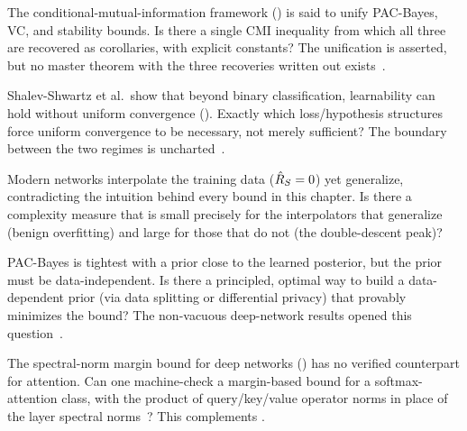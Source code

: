 \begin{openprob}
\label{op:cmi-unification}
The conditional-mutual-information framework () is said to
unify PAC-Bayes, VC, and stability bounds.  Is there a single CMI inequality
from which all three are recovered as corollaries, with explicit constants?
The unification is asserted, but no master theorem with the three recoveries
written out exists~\cite{SteinkeZakynthinou2020}.
\end{openprob}

\begin{openprob}
\label{op:uniform-necessity}
Shalev-Shwartz et al.\ show that beyond binary classification, learnability
can hold without uniform convergence ().  Exactly
which loss/hypothesis structures force uniform convergence to be necessary,
not merely sufficient?  The boundary between the two regimes is
uncharted~\cite{ShalevShwartzShamir2010}.
\end{openprob}

\begin{openprob}
\label{op:benign-overfitting}
Modern networks interpolate the training data ($\hat{R}_S = 0$) yet
generalize, contradicting the intuition behind every bound in this chapter.
Is there a complexity measure that is small precisely for the interpolators
that generalize (benign overfitting) and large for those that do not (the
double-descent peak)?
\end{openprob}

\begin{openprob}
\label{op:pac-bayes-prior}
PAC-Bayes is tightest with a prior close to the learned posterior, but the
prior must be data-independent.  Is there a principled, optimal way to build
a data-dependent prior (via data splitting or differential privacy) that
provably minimizes the bound?  The non-vacuous deep-network results opened
this question~\cite{DziugaiteRoy2017}.
\end{openprob}

\begin{openprob}
\label{op:margin-attention}
The spectral-norm margin bound for deep networks ()
has no verified counterpart for attention.  Can one machine-check a
margin-based bound for a softmax-attention class, with the product of
query/key/value operator norms in place of the layer spectral
norms~\cite{BartlettFosterTelgarsky2017}?  This complements
.
\end{openprob}

